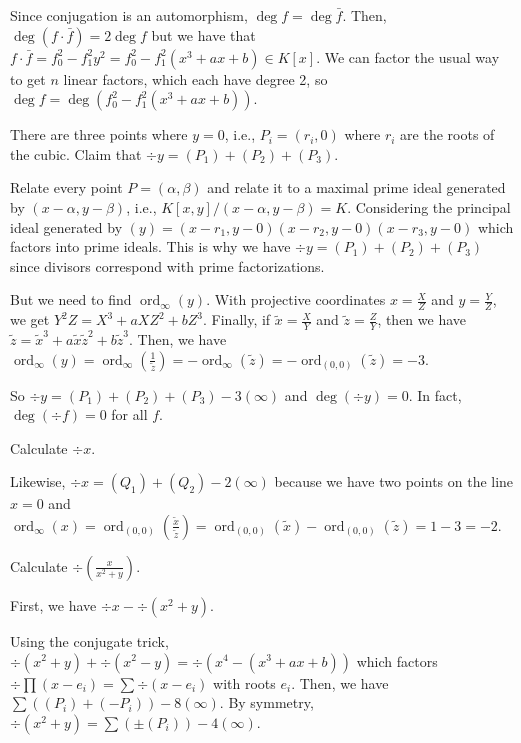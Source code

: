 \documentclass[notes]{agony}
\newcommand{\ord}{\operatorname{ord}}
\begin{document}
Since conjugation is an automorphism, $\deg f = \deg \bar f$.
Then, $\deg(f\cdot\bar f) = 2\deg f$
but we have that $f\cdot\bar f = f_0^2 - f_1^2 y^2
  = f_0^2 - f_1^2(x^3 + ax + b) \in K[x]$.
We can factor the usual way to get $n$ linear factors,
which each have degree 2, so $\deg f = \deg(f_0^2 - f_1^2(x^3+ax+b))$.

There are three points where $y = 0$, i.e., $P_i = (r_i, 0)$
where $r_i$ are the roots of the cubic.
Claim that $\div y = (P_1) + (P_2) + (P_3)$.

Relate every point $P = (\alpha, \beta)$
and relate it to a maximal prime ideal generated by $(x-\alpha, y-\beta)$,
i.e., $K[x,y]/(x-\alpha,y-\beta) = K$.
Considering the principal ideal generated by
$(y) = (x-r_1, y-0)(x-r_2,y-0)(x-r_3,y-0)$ which factors into prime ideals.
This is why we have $\div y = (P_1) + (P_2) + (P_3)$
since divisors correspond with prime factorizations.

But we need to find $\ord_{\infty}(y)$.
With projective coordinates $x = \frac{X}{Z}$ and $y = \frac{Y}{Z}$,
we get $Y^2Z = X^3 + aXZ^2 + bZ^3$.
Finally, if $\tilde x = \frac{X}{Y}$ and $\tilde z = \frac{Z}{Y}$,
then we have $\tilde z = \tilde x^3 + a\tilde x\tilde z^2 + b\tilde z^3$.
Then, we have $\ord_{\infty}(y) = \ord_{\infty}(\frac{1}{\tilde z}) 
  = -\ord_{\infty}(\tilde z) = -\ord_{(0,0)}(\tilde z) = -3$.

So $\div y = (P_1) + (P_2) + (P_3) - 3(\infty)$
and $\deg(\div y) = 0$.
In fact, $\deg(\div f) = 0$ for all $f$.

\begin{example}
  Calculate $\div x$.
\end{example}
\begin{sol}
  Likewise, $\div x = (Q_1) + (Q_2) - 2(\infty)$
  because we have two points on the line $x=0$ and $\ord_{\infty}(x) = \ord_{(0,0)}(\frac{\tilde x}{\tilde z})
  = \ord_{(0,0)}(\tilde x) - \ord_{(0,0)}(\tilde z) = 1 - 3 = -2$.
\end{sol}

\begin{example}
  Calculate $\div(\frac{x}{x^2+y})$.
\end{example}
\begin{sol}
  First, we have $\div x - \div(x^2 + y)$.

  Using the conjugate trick, $\div(x^2+y) + \div(x^2-y) = \div(x^4 - (x^3+ax+b))$
  which factors $\div \prod (x-e_i) = \sum \div (x-e_i)$ with roots $e_i$.
  Then, we have $\sum((P_i) + (-P_i)) - 8(\infty)$.
  By symmetry, $\div(x^2+y) = \sum(\pm (P_i)) - 4(\infty)$.
\end{sol}
\end{document}
